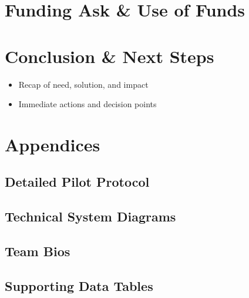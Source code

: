 \documentclass[a4paper,11pt]{article}
\begin{document}
\section{Funding Ask \& Use of Funds}


\section{Conclusion \& Next Steps}
\begin{itemize}
  \item Recap of need, solution, and impact
  \item Immediate actions and decision points
\end{itemize}

\newpage


\printbibliography

\appendix
\section{Appendices}
\subsection{Detailed Pilot Protocol}
\subsection{Technical System Diagrams}
\subsection{Team Bios}
\subsection{Supporting Data Tables}
\end{document}
